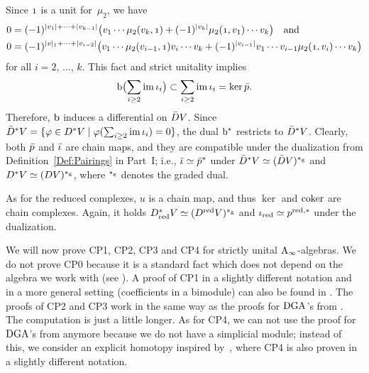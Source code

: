 \documentclass[\MainFolder/Text.tex]{subfiles}
\begin{document}
\begin{Remark}
Since $\NOne$ is a unit for~$\mu_2$, we have
\begin{align*}
0 & = (-1)^{\Abs{v_1} + \dotsb + \Abs{v_{k-1}}}\bigl(v_1 \dotsb \mu_2(v_k, \NOne) + (-1)^{\Abs{v_k}}\mu_2(\NOne,v_1)\dotsb v_k \bigr)\quad\text{and}\\
0 & = (-1)^{\Abs{v}_1 + \dotsb + \Abs{v_{i-2}}}\bigl(v_1 \dotsb \mu_2(v_{i-1}, \NOne) v_i \dotsb v_k + (-1)^{\Abs{v_{i-1}}} v_1 \dotsb  v_{i-1}\mu_2(\NOne, v_i) \dotsb v_k \bigr)
\end{align*}
for all $i=2$, $\dotsc$, $k$. This fact and strict unitality implies
\[ \mathrm{b}\bigl(\sum_{i\ge 2}\operatorname{im} \iota_i\bigr)\subset\sum_{i\ge 2}\operatorname{im} \iota_i = \ker \bar{p}.\]
Therefore, $\mathrm{b}$ induces a differential on $\bar{D} V$. Since $\bar{D}^* V = \{\varphi\in D^*V \mid \varphi(\sum_{i\ge 2}\operatorname{im}\iota_i) = 0\}$, the dual $\mathrm{b}^*$ restricts to $\bar{D}^* V$. Clearly, both $\bar{p}$ and $\bar{\iota}$ are chain maps, and they are compatible under the dualization from Definition~\ref{Def:Pairings} in Part~I; i.e., $\bar{\iota} \simeq \bar{p}^*$ under $\bar{D}^* V \simeq (\bar{D} V)^{*_{\mathrm{g}}}$ and $D^* V \simeq (D V)^{*_{\mathrm{g}}}$, where $^{*_{\mathrm{g}}}$ denotes the graded dual.
 
As for the reduced complexes, $u$ is a chain map, and thus $\ker$ and $\operatorname{\mathrm{coker}}$ are chain complexes. Again, it holds $D_{\mathrm{red}}^* V \simeq (D^{\mathrm{red}} V)^{*_{\mathrm{g}}}$ and $\iota_{\mathrm{red}} \simeq p^{\mathrm{red},*}$ under the dualization.
\end{Remark}

We will now prove CP1, CP2, CP3 and CP4 for strictly unital $\mathrm{A}_\infty$-algebras. We do not prove CP0 because it is a standard fact which does not depend on the algebra we work with (see \cite{LodayCyclic}). A proof of CP1 in a slightly different notation and in a more general setting (coefficients in a bimodule) can also be found in \cite{Mescher2016}. The proofs of CP2 and CP3 work in the same way as the proofs for $\mathrm{DGA}$'s from \cite{LodayCyclic}. The computation is just a little longer. As for CP4, we can not use the proof for $\mathrm{DGA}$'s from \cite[Proposition~1.6.5]{LodayCyclic} anymore because we do not have a simplicial module; instead of this, we consider an explicit homotopy inspired by~\cite{Lazarev2003}, where CP4 is also proven in a slightly different notation.
\end{document}
